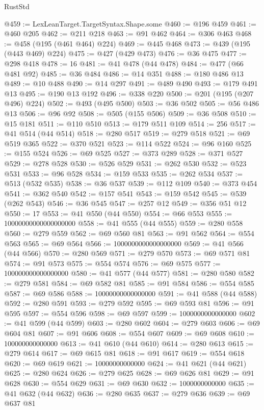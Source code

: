 \begin{lexlean}{RustStd}
\begin{coremodule}
@459 := LexLeanTarget.TargetSyntax.Shape.some
@460 := @196 @459
@461 := @460 @205
@462 := @211 @218
@463 := @91 @462
@464 := @306 @463
@468 := @458 (@195 (@461 @464) @224)
@469 := @445 @468
@473 := @439 (@195 (@443 @469) @224)
@475 := @427 (@429 @473)
@476 := @36 @475
@477 := @298 @418
@478 := 16
@481 := @41 @478 (@44 @478)
@484 := @477 (@66 @481 @92)
@485 := @36 @484
@486 := @14 @351
@488 := @180 @486 @13
@489 := @10 @488
@490 := @14 @297
@491 := @489 @490
@493 := @179 @491 @13
@495 := @190 @13 @192
@496 := @338 @220
@500 := @201 (@195 (@207 @496) @224)
@502 := @493 (@495 @500)
@503 := @36 @502
@505 := @56 @486 @13
@506 := @96 @92
@508 := @505 (@155 @506)
@509 := @36 @508
@510 := @15 @181
@511 := @110 @510
@513 := @179 @511 @109
@514 := 256
@517 := @41 @514 (@44 @514)
@518 := @280 @517
@519 := @279 @518
@521 := @69 @519 @365
@522 := @370 @521
@523 := @114 @522
@524 := @96 @160
@525 := @155 @524
@526 := @69 @525
@527 := @373 @289
@528 := @371 @527
@529 := @278 @528
@530 := @526 @529
@531 := @262 @530
@532 := @523 @531
@533 := @96 @528
@534 := @159 @533
@535 := @262 @534
@537 := @513 (@532 @535)
@538 := @36 @537
@539 := @112 @109
@540 := @373 @454
@541 := @362 @540
@542 := @157 @541
@543 := @159 @542
@545 := @539 (@262 @543)
@546 := @36 @545
@547 := @257 @12
@549 := @356 @51 @12
@550 := 17
@553 := @41 @550 (@44 @550)
@554 := @66 @553
@555 := 10000000000000000000
@558 := @41 @555 (@44 @555)
@559 := @280 @558
@560 := @279 @559
@562 := @69 @560 @81
@563 := @91 @562
@564 := @554 @563
@565 := @69 @564
@566 := 1000000000000000000
@569 := @41 @566 (@44 @566)
@570 := @280 @569
@571 := @279 @570
@573 := @69 @571 @81
@574 := @91 @573
@575 := @554 @574
@576 := @69 @575
@577 := 100000000000000000
@580 := @41 @577 (@44 @577)
@581 := @280 @580
@582 := @279 @581
@584 := @69 @582 @81
@585 := @91 @584
@586 := @554 @585
@587 := @69 @586
@588 := 10000000000000000
@591 := @41 @588 (@44 @588)
@592 := @280 @591
@593 := @279 @592
@595 := @69 @593 @81
@596 := @91 @595
@597 := @554 @596
@598 := @69 @597
@599 := 1000000000000000
@602 := @41 @599 (@44 @599)
@603 := @280 @602
@604 := @279 @603
@606 := @69 @604 @81
@607 := @91 @606
@608 := @554 @607
@609 := @69 @608
@610 := 100000000000000
@613 := @41 @610 (@44 @610)
@614 := @280 @613
@615 := @279 @614
@617 := @69 @615 @81
@618 := @91 @617
@619 := @554 @618
@620 := @69 @619
@621 := 10000000000000
@624 := @41 @621 (@44 @621)
@625 := @280 @624
@626 := @279 @625
@628 := @69 @626 @81
@629 := @91 @628
@630 := @554 @629
@631 := @69 @630
@632 := 1000000000000
@635 := @41 @632 (@44 @632)
@636 := @280 @635
@637 := @279 @636
@639 := @69 @637 @81

\end{coremodule}
\end{lexlean}
